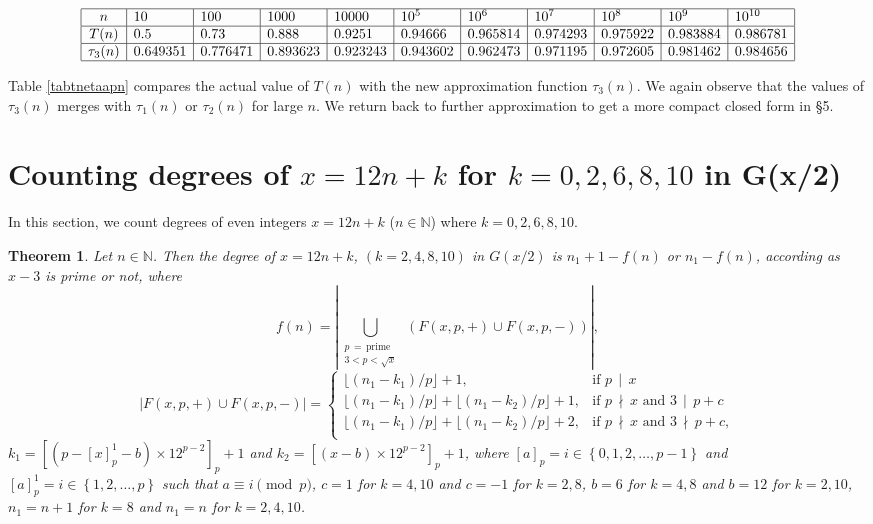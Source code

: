 \documentclass[11pt]{article}
\newtheorem{theorem}{Theorem}[section]
\theoremstyle{definition}
\theoremstyle{remark}
\numberwithin{equation}{section}
\newcommand{\Nat}{\mathbb{N}}
\newcommand{\set}[1]{\left\{#1\right\}}
\newcommand{\Mod}[3]{#1\equiv #2 \pmod{#3}}
\newcommand{\Div}[2]{#1\,\mid\, #2}
\newcommand{\nDiv}[2]{#1\,\nmid\, #2}
\begin{document}
\begin{table}[hb]
{\footnotesize $$\begin{array}{|c|l|l|l|l|l|l|l|l|l|l|}
\hline
n & 10 & 100 & 1000 & 10000 & 10^5 & 10^6 & 10^7 & 10^8 & 10^9 & 10^{10}\\
\hline
T(n) & 0.5 & 0.73 & 0.888 & 0.9251 & 0.94666 & 0.965814 & 0.974293 & 0.975922 & 0.983884 & 0.986781\\
\hline
\tau_3(n) & 0.649351 & 0.776471 & 0.893623 & 0.923243 & 0.943602 & 0.962473 & 0.971195 & 0.972605 & 0.981462 & 0.984656\\
\hline
\end{array}$$}
\caption{Comparison table for $T(n)$ and $\tau_3(n)$ for $x=12n+4$.}\label{tabtnetaapn}
\end{table}

\vspace{1em}
\noindent
Table \ref{tabtnetaapn} compares the actual value of $T(n)$ with the new approximation function $\tau_3(n)$. We again observe that the values of $\tau_3(n)$ merges with $\tau_1(n)$ or $\tau_2(n)$ for large $n$. We return back to further approximation to get a more compact closed form in \S 5.

\section{Counting degrees of $x=12n+k$ for $k=0,2,6,8,10$ in G(x/2)}\label{seckother}

In this section, we count degrees of even integers $x=12n+k$ ($n\in\Nat$) where $k=0,2,6,8,10$. 

\begin{theorem}\label{thm24810}
Let $n\in\Nat$. Then the degree of $x=12n+k$, $(k=2,4,8,10)$ in $G(x/2)$ is $n_1+1-f(n)$ or $n_1-f(n)$, according as $x-3$ is prime or not, where
$$f(n)=|\bigcup\limits_{\substack{p\, =\, \text{prime}\\ 3< p<\sqrt{x}}} \ \left(F(x,p,+)\cup F(x,p,-)\right)|,$$
$$|F(x,p,+)\cup F(x,p,-)|=\left\{\begin{array}{ll}
\lfloor (n_1-k_1)/p\rfloor+1, & \text{if } \Div{p}{x}\\
\lfloor (n_1-k_1)/p\rfloor + \lfloor (n_1-k_2)/p\rfloor +1, & \text{if } \nDiv{p}{x}\text{ and } \Div{3}{p+c}\\
\lfloor (n_1-k_1)/p\rfloor + \lfloor (n_1-k_2)/p\rfloor +2, & \text{if } \nDiv{p}{x}\text{ and } \nDiv{3}{p+c},\\
\end{array}\right.$$
$k_1=[(p-[x]_p^1-b)\times 12^{p-2}]_p+1$ and $k_2=[(x-b)\times 12^{p-2}]_p+1$, where $[a]_p=i\in\set{0,1,2,\ldots,p-1}$ and $[a]_p^1=i\in\set{1,2,\ldots,p}$ such that $\Mod{a}{i}{p}$, $c=1$ for $k=4,10$ and $c=-1$ for $k=2,8$, $b=6$ for $k=4,8$ and $b=12$ for $k=2,10$, $n_1=n+1$ for $k=8$ and $n_1=n$ for $k=2,4,10$.
\end{theorem}
\end{document}
